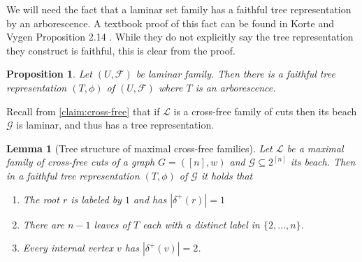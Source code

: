 \documentclass[10pt,a4paper]{article}
\newcommand{\Lcal}{\mathcal{L}}
\newcommand{\Fcal}{\mathcal{F}}
\newcommand{\Gcal}{\mathcal{G}}
\newcommand{\1}{\mathbf{1}}
\newtheorem{lemma}[theorem]{Lemma}
\newtheorem{proposition}[theorem]{Proposition}
\theoremstyle{definition}
\begin{document}
We will need the fact that a laminar set family has a faithful tree representation by an arborescence.  A textbook proof of this fact can be found
in Korte and Vygen Proposition 2.14 \cite{KV18}.  While they do not explicitly say the tree representation they construct is faithful,
this is clear from the proof.
\begin{proposition}
\label{prop:treerep}
Let $(U,\Fcal)$ be laminar family.  Then there is a faithful tree representation $(T,\phi)$ of $(U,\Fcal)$ where $T$ is an arborescence.
\end{proposition}

Recall from \cref{claim:cross-free} that if $\Lcal$ is a cross-free family of cuts then its beach $\Gcal$ is laminar, and thus has a tree representation.
\begin{lemma}[Tree structure of maximal cross-free families]
\label{lem:tree_structure}
Let $\Lcal$ be a maximal family of cross-free cuts of a graph $G= ([n],w)$ and $\Gcal \subseteq 2^{[n]}$ its beach.  Then in a faithful tree representation $(T,\phi)$ of $\Gcal$
it holds that
\begin{enumerate}
\item The root $r$ is labeled by $1$ and has $|\delta^+(r)| = 1$
\item There are $n-1$ leaves of $T$ each with a distinct label in $\{2, \ldots, n\}$.
\item Every internal vertex $v$ has $|\delta^+(v)| = 2$.
\end{enumerate}
\end{lemma}
\end{document}
